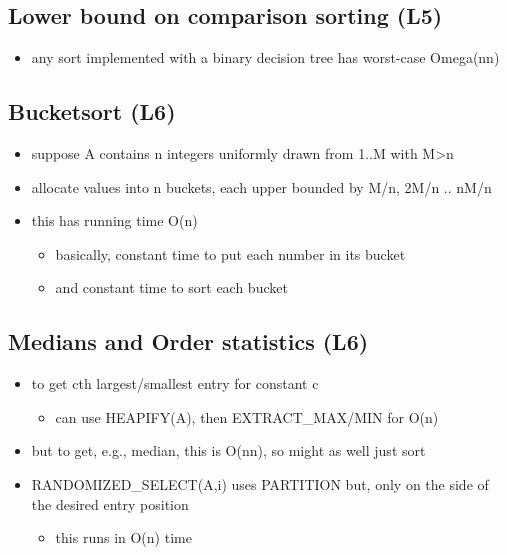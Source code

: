 \documentclass[
]{article}
\providecommand{\tightlist}{%
  \setlength{\itemsep}{0pt}\setlength{\parskip}{0pt}}
\begin{document}
\hypertarget{lower-bound-on-comparison-sorting-l5}{%
\subsection{Lower bound on comparison sorting
(L5)}\label{lower-bound-on-comparison-sorting-l5}}

\begin{itemize}
\tightlist
\item
  any sort implemented with a binary decision tree has worst-case
  Omega(n\log n)
\end{itemize}

\hypertarget{bucketsort-l6}{%
\subsection{Bucketsort (L6)}\label{bucketsort-l6}}

\begin{itemize}
\tightlist
\item
  suppose A contains n integers uniformly drawn from 1..M with
  M\textgreater n
\item
  allocate values into n buckets, each upper bounded by M/n, 2M/n ..
  nM/n
\item
  this has running time O(n)

  \begin{itemize}
  \tightlist
  \item
    basically, constant time to put each number in its bucket
  \item
    and constant time to sort each bucket
  \end{itemize}
\end{itemize}

\hypertarget{medians-and-order-statistics-l6}{%
\subsection{Medians and Order statistics
(L6)}\label{medians-and-order-statistics-l6}}

\begin{itemize}
\tightlist
\item
  to get cth largest/smallest entry for constant c

  \begin{itemize}
  \tightlist
  \item
    can use HEAPIFY(A), then EXTRACT\_MAX/MIN for O(\log n)
  \end{itemize}
\item
  but to get, e.g., median, this is O(n\log n), so might as well just
  sort
\item
  RANDOMIZED\_SELECT(A,i) uses PARTITION but, only on the side of the
  desired entry position

  \begin{itemize}
  \tightlist
  \item
    this runs in O(n) time
  \end{itemize}
\end{itemize}
\end{document}
